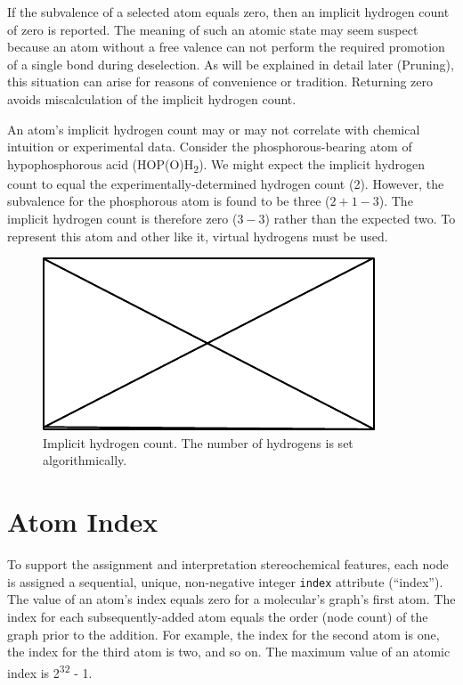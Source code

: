 \documentclass{article}
\def\ttt{\texttt}
\begin{document}
If the subvalence of a selected atom equals zero, then an implicit hydrogen count of zero is reported. The meaning of such an atomic state may seem suspect because an atom without a free valence can not perform the required promotion of a single bond during deselection. As will be explained in detail later (Pruning), this situation can arise for reasons of convenience or tradition. Returning zero avoids miscalculation of the implicit hydrogen count.

An atom's implicit hydrogen count may or may not correlate with chemical intuition or experimental data. Consider the phosphorous-bearing atom of hypophosphorous acid (HOP(O)H\textsubscript{2}). We might expect the implicit hydrogen count to equal the experimentally-determined hydrogen count (2). However, the subvalence for the phosphorous atom is found to be three ($2 + 1 - 3$). The implicit hydrogen count is therefore zero ($3 - 3$) rather than the expected two. To represent this atom and other like it, virtual hydrogens must be used.

\begin{figure}
    \centering
    \includegraphics{filler}
    \caption{Implicit hydrogen count. The number of hydrogens is set algorithmically.}
    \label{fig:implicit-hydrogen-count}
\end{figure}

\section*{Atom Index}

To support the assignment and interpretation stereochemical features, each node is assigned a sequential, unique, non-negative integer \ttt{index} attribute (\enquote{index}). The value of an atom's index equals zero for a molecular's graph's first atom. The index for each subsequently-added atom equals the order (node count) of the graph prior to the addition. For example, the index for the second atom is one, the index for the third atom is two, and so on. The maximum value of an atomic index is 2\textsuperscript{32} - 1.
\end{document}
